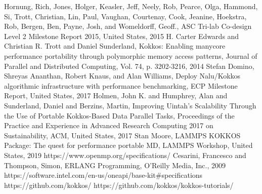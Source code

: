 \documentclass[conference]{IEEEtran}
\begin{document}
\begin{thebibliography}{00}
 Hornung, Rich, Jones, Holger, Keasler, Jeff, Neely, Rob, Pearce, Olga, Hammond, Si, Trott, Christian, Lin, Paul, Vaughan, Courtenay, Cook, Jeanine, Hoekstra, Rob, Bergen, Ben, Payne, Josh, and Womeldorff, Geoff., ASC Tri-lab Co-design Level 2 Milestone Report 2015, United States, 2015
 H. Carter Edwards and Christian R. Trott and Daniel Sunderland, 
Kokkos: Enabling manycore performance portability through polymorphic memory access patterns, Journal of Parallel and Distributed Computing, Vol. 74, p. 3202-3216, 2014
 Stefan Domino, Shreyas Ananthan, Robert Knaus, and Alan Williams, 
Deploy Nalu/Kokkos algorithmic infrastructure with performance benchmarking, ECP Milestone Report, United States, 2017
 Holmen, John K. and Humphrey, Alan and Sunderland, Daniel and Berzins, Martin, Improving Uintah’s Scalability Through the Use of Portable Kokkos-Based Data Parallel Tasks, Proceedings of the Practice and Experience in Advanced Research Computing 2017 on Sustainability, ACM, United States, 2017
 Stan Moore, LAMMPS KOKKOS Package: The quest for performance portable MD, LAMMPS Workshop, United States, 2019
 https://www.openmp.org/specifications/
 Cesarini, Francesco and Thompson, Simon, ERLANG Programming, O’Reilly Media, Inc., 2009
 https://software.intel.com/en-us/oneapi/base-kit\#specifications
 https://github.com/kokkos/
 https://github.com/kokkos/kokkos-tutorials/
\end{thebibliography}
\end{document}
